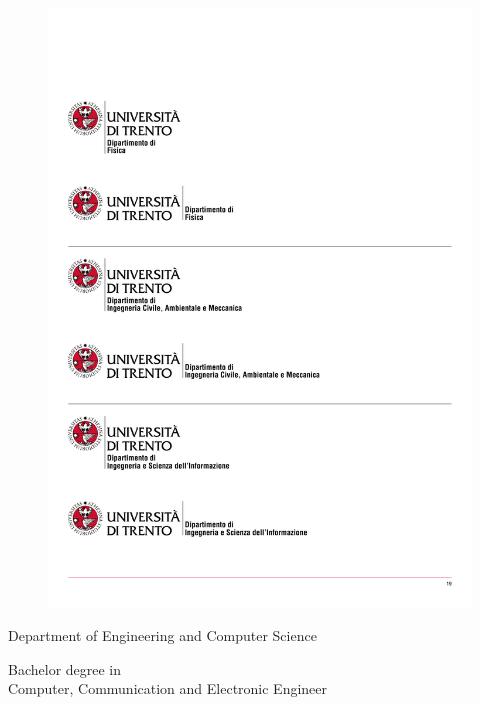 \pagestyle{plain}

\thispagestyle{empty}

\begin{center}
  \begin{figure}[h!]
  \centering
    \includegraphics[trim= 1cm 3.5cm 8.1cm 24.2cm, clip]{img/unitnlogo.pdf}
  \end{figure}

  \vspace{2 cm} 

  \LARGE{Department of Engineering and Computer Science\\}

  \vspace{1 cm} 
  \Large{Bachelor degree in\\
    Computer, Communication and Electronic Engineer
  }


\end{center}
